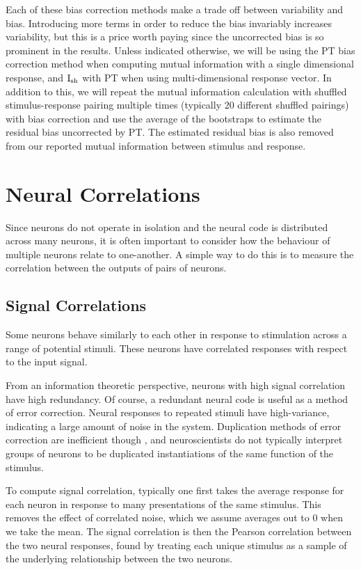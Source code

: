 Each of these bias correction methods make a trade off between variability and bias.
Introducing more terms in order to reduce the bias invariably increases variability, but this is a price worth paying since the uncorrected bias is so prominent in the results.
Unless indicated otherwise, we will be using the \ac{PT} bias correction method when computing mutual information with a single dimensional response, and $\operatorname{I}_{\text{sh}}$ with \ac{PT} when using multi-dimensional response vector.
In addition to this, we will repeat the mutual information calculation with shuffled stimulus-response pairing multiple times (typically 20 different shuffled pairings) with bias correction and use the average of the bootstraps to estimate the residual bias uncorrected by \ac{PT}.
The estimated residual bias is also removed from our reported mutual information between stimulus and response.


\section{Neural Correlations}

Since neurons do not operate in isolation and the neural code is distributed across many neurons, it is often important to consider how the behaviour of multiple neurons relate to one-another.
A simple way to do this is to measure the correlation between the outputs of pairs of neurons.


\subsection{Signal Correlations}

Some neurons behave similarly to each other in response to stimulation across a range of potential stimuli.
These neurons have correlated responses with respect to the input signal.

From an information theoretic perspective, neurons with high signal correlation have high redundancy.
Of course, a redundant neural code is useful as a method of error correction.
Neural responses to repeated stimuli have high-variance, indicating a large amount of noise in the system.
Duplication methods of error correction are inefficient though \citep[Chapter ?????]{mackay2003information}, and neuroscientists do not typically interpret groups of neurons to be duplicated instantiations of the same function of the stimulus.

To compute signal correlation, typically one first takes the average response for each neuron in response to many presentations of the same stimulus.
This removes the effect of correlated noise, which we assume averages out to $0$ when we take the mean.
The signal correlation is then the Pearson correlation between the two neural responses, found by treating each unique stimulus as a sample of the underlying relationship between the two neurons.


